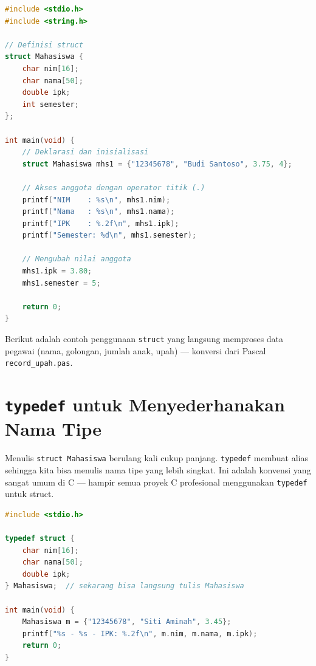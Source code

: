 \documentclass[../main.tex]{subfiles}
\begin{document}
\begin{lstlisting}[language=C,caption=Definisi dan penggunaan \texttt{struct}]
#include <stdio.h>
#include <string.h>

// Definisi struct
struct Mahasiswa {
    char nim[16];
    char nama[50];
    double ipk;
    int semester;
};

int main(void) {
    // Deklarasi dan inisialisasi
    struct Mahasiswa mhs1 = {"12345678", "Budi Santoso", 3.75, 4};
    
    // Akses anggota dengan operator titik (.)
    printf("NIM    : %s\n", mhs1.nim);
    printf("Nama   : %s\n", mhs1.nama);
    printf("IPK    : %.2f\n", mhs1.ipk);
    printf("Semester: %d\n", mhs1.semester);
    
    // Mengubah nilai anggota
    mhs1.ipk = 3.80;
    mhs1.semester = 5;
    
    return 0;
}
\end{lstlisting}

Berikut adalah contoh penggunaan \texttt{struct} yang langsung memproses data pegawai (nama, golongan, jumlah anak, upah) --- konversi dari Pascal \texttt{record\_upah.pas}.



\section{\texttt{typedef} untuk Menyederhanakan Nama Tipe}

Menulis \texttt{struct Mahasiswa} berulang kali cukup panjang. \texttt{typedef} membuat alias sehingga kita bisa menulis nama tipe yang lebih singkat. Ini adalah konvensi yang sangat umum di C --- hampir semua proyek C profesional menggunakan \texttt{typedef} untuk struct.

\begin{lstlisting}[language=C,caption=\texttt{typedef} untuk struct]
#include <stdio.h>

typedef struct {
    char nim[16];
    char nama[50];
    double ipk;
} Mahasiswa;  // sekarang bisa langsung tulis Mahasiswa

int main(void) {
    Mahasiswa m = {"12345678", "Siti Aminah", 3.45};
    printf("%s - %s - IPK: %.2f\n", m.nim, m.nama, m.ipk);
    return 0;
}
\end{lstlisting}
\end{document}
